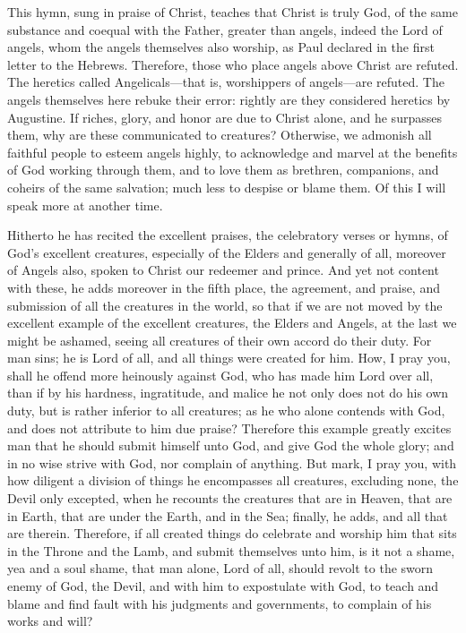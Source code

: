 This hymn, sung in praise of Christ, teaches that Christ is truly God, of the same substance and coequal with the Father, greater than angels, indeed the Lord of angels, whom the angels themselves also worship, as Paul declared in the first letter to the Hebrews. Therefore, those who place angels above Christ are refuted. The heretics called Angelicals—that is, worshippers of angels—are refuted. The angels themselves here rebuke their error: rightly are they considered heretics by Augustine. If riches, glory, and honor are due to Christ alone, and he surpasses them, why are these communicated to creatures? Otherwise, we admonish all faithful people to esteem angels highly, to acknowledge and marvel at the benefits of God working through them, and to love them as brethren, companions, and coheirs of the same salvation; much less to despise or blame them. Of this I will speak more at another time.

Hitherto he has recited the excellent praises, the celebratory verses or hymns, of God’s excellent creatures, especially of the Elders and generally of all, moreover of Angels also, spoken to Christ our redeemer and prince. And yet not content with these, he adds moreover in the fifth place, the agreement, and praise, and submission of all the creatures in the world, so that if we are not moved by the excellent example of the excellent creatures, the Elders and Angels, at the last we might be ashamed, seeing all creatures of their own accord do their duty. For man sins; he is Lord of all, and all things were created for him. How, I pray you, shall he offend more heinously against God, who has made him Lord over all, than if by his hardness, ingratitude, and malice he not only does not do his own duty, but is rather inferior to all creatures; as he who alone contends with God, and does not attribute to him due praise? Therefore this example greatly excites man that he should submit himself unto God, and give God the whole glory; and in no wise strive with God, nor complain of anything. But mark, I pray you, with how diligent a division of things he encompasses all creatures, excluding none, the Devil only excepted, when he recounts the creatures that are in Heaven, that are in Earth, that are under the Earth, and in the Sea; finally, he adds, and all that are therein. Therefore, if all created things do celebrate and worship him that sits in the Throne and the Lamb, and submit themselves unto him, is it not a shame, yea and a soul shame, that man alone, Lord of all, should revolt to the sworn enemy of God, the Devil, and with him to expostulate with God, to teach and blame and find fault with his judgments and governments, to complain of his works and will?

